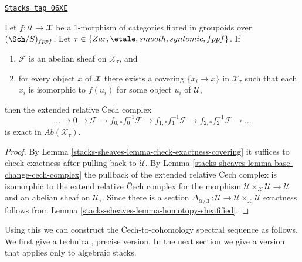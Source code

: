 \begin{proposition}
\label{stacks-sheaves-proposition-exactness-cech-complex}
\href{https://stacks.math.columbia.edu/tag/06XE}{\texttt{Stacks tag 06XE}}

Let $f : \mathcal{U} \to \mathcal{X}$ be a $1$-morphism of categories fibred
in groupoids over $(\Sch/S)_{fppf}$. Let
$\tau \in \{Zar, \etale, smooth, syntomic, fppf\}$.
If
\begin{enumerate}
\item $\mathcal{F}$ is an abelian sheaf on $\mathcal{X}_\tau$, and
\item for every object $x$ of $\mathcal{X}$ there exists a covering
$\{x_i \to x\}$ in $\mathcal{X}_\tau$ such that each $x_i$ is isomorphic
to $f(u_i)$ for some object $u_i$ of $\mathcal{U}$,
\end{enumerate}
then the extended relative {\v C}ech complex
$$
\ldots \to 0 \to
\mathcal{F} \to
f_{0, *}f_0^{-1}\mathcal{F} \to
f_{1, *}f_1^{-1}\mathcal{F} \to
f_{2, *}f_2^{-1}\mathcal{F} \to \ldots
$$
is exact in $\textit{Ab}(\mathcal{X}_\tau)$.
\end{proposition}

\begin{proof}
By
Lemma \ref{stacks-sheaves-lemma-check-exactness-covering}
it suffices to check exactness after pulling back to $\mathcal{U}$.
By
Lemma \ref{stacks-sheaves-lemma-base-change-cech-complex}
the pullback of the extended relative {\v C}ech complex is isomorphic
to the extend relative {\v C}ech complex for the morphism
$\mathcal{U} \times_\mathcal{X} \mathcal{U} \to \mathcal{U}$
and an abelian sheaf on $\mathcal{U}_\tau$. Since there is a section
$\Delta_{\mathcal{U}/\mathcal{X}} : \mathcal{U} \to
\mathcal{U} \times_\mathcal{X} \mathcal{U}$ exactness follows from
Lemma \ref{stacks-sheaves-lemma-homotopy-sheafified}.
\end{proof}

Using this we can construct the {\v C}ech-to-cohomology spectral sequence
as follows. We first give a technical, precise version. In the next section
we give a version that applies only to algebraic stacks.

